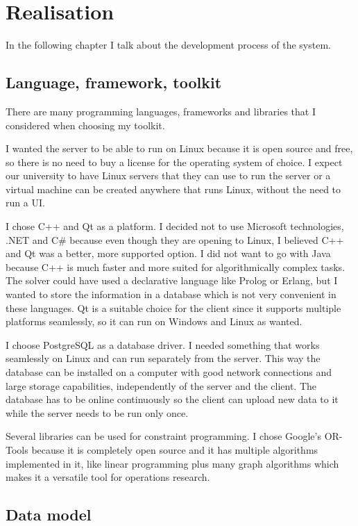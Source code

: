 \chapter{Realisation}

In the following chapter I talk about the development process of the system.

\section{Language, framework, toolkit}

There are many programming languages, frameworks and libraries that I considered when choosing my toolkit.

I wanted the server to be able to run on Linux because it is open source and free, so there is no need to buy a license for the operating system of choice. I expect our university to have Linux servers that they can use to run the server or a virtual machine can be created anywhere that runs Linux, without the need to run a UI.

I chose C++ and Qt as a platform. I decided not to use Microsoft technologies, .NET and C\# because even though they are opening to Linux, I believed C++ and Qt was a better, more supported option. I did not want to go with Java because C++ is much faster and more suited for algorithmically complex tasks. The solver could have used a declarative language like Prolog or Erlang, but I wanted to store the information in a database which is not very convenient in these languages. Qt is a suitable choice for the client since it supports multiple platforms seamlessly, so it can run on Windows and Linux as wanted.

I choose PostgreSQL as a database driver. I needed something that works seamlessly on Linux and can run separately from the server. This way the database can be installed on a computer with good network connections and large storage capabilities, independently of the server and the client. The database has to be online continuously so the client can upload new data to it while the server needs to be run only once.

Several libraries can be used for constraint programming. I chose Google's OR-Tools \cite{ORTD} \cite{ORTS} because it is completely open source and it has multiple algorithms implemented in it, like linear programming plus many graph algorithms which makes it a versatile tool for operations research.

\section{Data model}

